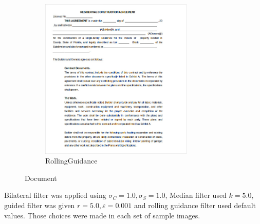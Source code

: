 \documentclass[12pt]{article}
\begin{document}
\begin{figure}
		\begin{subfigure}{0.4\textwidth}
			\centering
			\includegraphics[width=0.8\textwidth]{document/documentjpgRollingGuidanceFilter.png}
			\caption{RollingGuidance}
		\end{subfigure}
		\caption{Document}
	\end{figure}

	Bilateral filter was applied using $\sigma_C = 1.0, \sigma_S = 1.0$, Median filter used $k = 5.0$, guided filter was given $r = 5.0, \varepsilon = 0.001$ and rolling guidance filter used default values. Those choices were made in each set of sample images.
\end{document}
